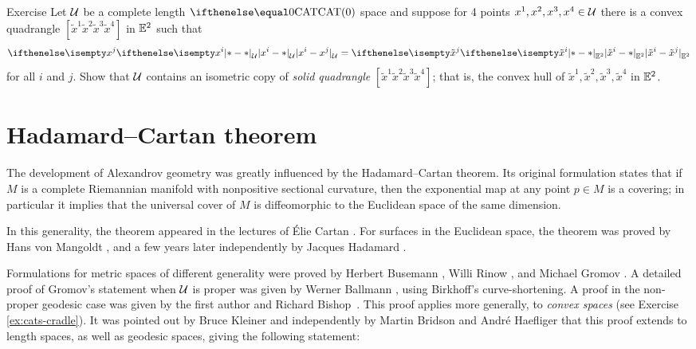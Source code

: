 \begin{thm}{Exercise}\label{ex:square}
Let $\mathcal{U}$ be a complete length $\CAT0$ space and 
suppose 
for 4 points $x^1,x^2,x^3,x^4\in \spc{U}$
there is a convex quadrangle
$[\tilde x^1\tilde x^2\tilde x^3\tilde x^4]$
in $\mathbb{E}^2$
such that 
\[\dist{x^i}{x^j}{\spc{U}}=\dist{\tilde x^i}{\tilde x^j}{\EE^2}\]
for all $i$ and $j$.
Show that $\mathcal{U}$ contains an isometric copy of \emph{solid quadrangle}
$[\tilde x^1\tilde x^2\tilde x^3\tilde x^4]$; that is, the convex hull of $\tilde x^1,\tilde x^2,\tilde x^3,\tilde x^4$ in $\mathbb{E}^2$.
\end{thm}


\section{Hadamard--Cartan theorem}\label{sec:Hadamard--Cartan}

The development of Alexandrov geometry was greatly influenced by the Hadamard--Cartan theorem.
Its original formulation states that if $M$ is a complete Riemannian manifold with nonpositive sectional curvature, 
then the exponential map at any point $p\in M$ is a covering;
in particular it implies that the universal cover of $M$ is diffeomorphic to the Euclidean space of the same dimension.

In this generality, the theorem appeared in the lectures of \'Elie Cartan \cite{cartan}.
For surfaces in the Euclidean space, 
the theorem was proved by
Hans von Mangoldt \cite{mangoldt},  
and a few years later independently by Jacques Hadamard \cite{hadamard}.

Formulations for metric spaces of different generality were proved by 
Herbert Busemann \cite{busemann-CBA},
Willi Rinow \cite{rinow}, and 
Michael Gromov \cite[p.~119]{gromov:hyp-groups}. 
A detailed proof of Gromov's statement when $\mathcal{U}$ is proper  was given by Werner Ballmann \cite{ballmann:cartan-hadamard}, using Birkhoff's curve-shortening.  
A proof in the non-proper 
geodesic case 
was given by the first author and Richard Bishop~\cite{alexander-bishop:h-c}.  
This proof applies more generally, to {}\emph{convex spaces} (see Exercise \ref{ex:cats-cradle}).
It was pointed out by Bruce Kleiner \cite{ballmann:lectures} 
and independently by Martin Bridson and Andr\'{e} Haefliger \cite{bridson-haefliger} that 
this proof extends to length spaces, as well as geodesic spaces, giving the following statement:

